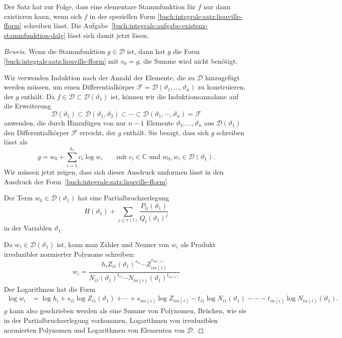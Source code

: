 Der Satz hat zur Folge, dass eine elementare Stammfunktion für $f$ 
nur dann existieren kann, wenn sich $f$ in der speziellen Form
\eqref{buch:integrale:satz:liouville-fform}
schreiben lässt.
Die Aufgabe~\ref{buch:integrale:aufgabe:existenz-stammfunktion-dalg}
lässt sich damit jetzt lösen.


\begin{proof}[Beweis]
Wenn die Stammfunktion $g\in\mathscr{D}$ ist, dann hat $g$ die Form
\eqref{buch:integrale:satz:liouville-fform} mit $v_0=g$, die Summe
wird nicht benötigt.

Wir verwenden Induktion nach der Anzahl der Elemente, die zu $\mathscr{D}$
hinzugefügt werden müssen, um einen Differentialkörper 
$\mathscr{F}=\mathscr{D}(\vartheta_1,\dots,\vartheta_n)$ zu konstruieren,
der $g$ enthält.
Da $f\in\mathscr{D}\subset\mathscr{D}(\vartheta_1)$ ist, können wir die
Induktionsannahme auf die Erweiterung
\[
\mathscr{D}(\vartheta_1)\subset\mathscr{D}(\vartheta_1,\vartheta_2)
\subset\cdots\subset \mathscr{D}(\vartheta_1,\cdots,\vartheta_n)=\mathscr{F}
\]
anwenden, die durch Hinzufügen von nur $n-1$ Elemente
$\vartheta_2,\dots,\vartheta_n$ aus $\mathscr{D}(\vartheta_1)$ den
Differentialkörper $\mathscr{F}$ erreicht, der $g$ enthält.
Sie besagt, dass sich $g$ schreiben lässt als
\[
g = w_0 + \sum_{i=1}^{k_1} c_i\log w_i
\qquad\text{mit $c_i\in\mathbb{C}$ und $w_0,w_i\in\mathscr{D}(\vartheta_1)$.}
\]
Wir müssen jetzt zeigen, dass sich dieser Ausdruck umformen lässt 
in den Ausdruck der Form~\eqref{buch:integrale:satz:liouville-fform}.

Der Term $w_0\in\mathscr{D}(\vartheta_1)$ hat eine Partialbruchzerlegung
\[
H(\vartheta_1)
+
\sum_{j\le r(l)} \frac{P_{lj}(\vartheta_1)}{Q_l(\vartheta_1)^j}
\]
in der Variablen $\vartheta_1$.

Da $w_i\in\mathscr{D}(\vartheta_1)$ ist, kann man Zähler und Nenner
von $w_i$ als Produkt irreduzibler normierter Polynome schreiben:
\[
w_i
=
\frac{h_i Z_{i1}(\vartheta_1)^{s_{i1}}\cdots Z_{im(i)}^{s_{im(i)}}
}{
N_{i1}(\vartheta_1)^{t_{i1}}\cdots N_{in(i)}(\vartheta_1)^{t_{in(i)}}
}
\]
Der Logarithmus hat die Form
\begin{align*}
\log w_i
&= \log h_i + 
s_{i1}
\log Z_{i1}(\vartheta_1)
+
\cdots
+
s_{im(i)}
\log Z_{im(i)}
-
t_{i1}
\log
N_{i1}(\vartheta_1)
-
\cdots
-
t_{in(i)}
\log
N_{in(i)}(\vartheta_1).
\end{align*}
$g$ kann also geschrieben werden als eine Summe von Polynomen, Brüchen,
wie sie in der Partialbruchzerlegung vorkommen, Logarithmen von irreduziblen
normierten Polynomen und Logarithmen von Elementen von $\mathscr{D}$.


\end{proof}
